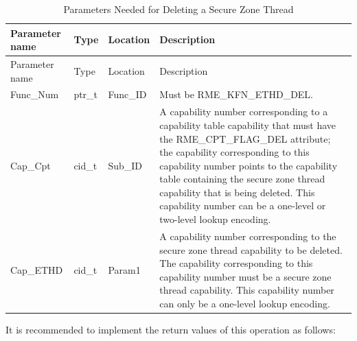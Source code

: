 \begin{xltabular}{\textwidth}{@{}>{\hsize\raggedright\arraybackslash}X>{\hsize\raggedright\arraybackslash}X>{\hsize\raggedright\arraybackslash}X>{\hsize\raggedright\arraybackslash}X@{}}
\caption{Parameters Needed for Deleting a Secure Zone Thread}\label{tab:8-102-delete-enclave-thread-parameters}\\
\toprule
Parameter name & Type & Location & Description\tabularnewline
\endfirsthead
\toprule
Parameter name & Type & Location & Description\tabularnewline
\midrule
\endhead
\bottomrule
\endlastfoot
Func\_Num & ptr\_t & Func\_ID &
Must be RME\_KFN\_ETHD\_DEL.\tabularnewline
Cap\_Cpt & cid\_t & Sub\_ID &
A capability number corresponding to a capability table capability that must have the RME\_CPT\_FLAG\_DEL attribute; the capability corresponding to this capability number points to the capability table containing the secure zone thread capability that is being deleted. This capability number can be a one-level or two-level lookup encoding.\tabularnewline
Cap\_ETHD & cid\_t & Param1 &
A capability number corresponding to the secure zone thread capability to be deleted. The capability corresponding to this capability number must be a secure zone thread capability. This capability number can only be a one-level lookup encoding.\tabularnewline
\end{xltabular}
\nopagebreak[4]

It is recommended to implement the return values of this operation as follows:


